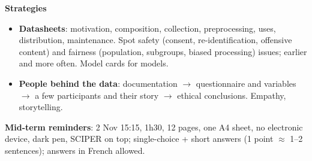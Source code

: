 \documentclass[11pt,a4paper,openany]{book}
\begin{document}
\begin{recapbox}[title={Exam-ready recap --- Fairness 2}]
\textbf{Strategies}
\begin{itemize}
  \item \textbf{Datasheets}: motivation, composition, collection, preprocessing, uses,
        distribution, maintenance. Spot safety (consent, re-identification, offensive content)
        and fairness (population, subgroups, biased processing) issues; earlier and more often.
        Model cards for models.
  \item \textbf{People behind the data}: documentation $\to$ questionnaire and variables $\to$
        a few participants and their story $\to$ ethical conclusions. Empathy, storytelling.
\end{itemize}
\textbf{Mid-term reminders}: 2 Nov 15:15, 1h30, 12 pages, one A4 sheet, no electronic device, dark
pen, SCIPER on top; single-choice + short answers (1 point $\approx$ 1--2 sentences); answers in
French allowed.
\end{recapbox}
\end{document}
